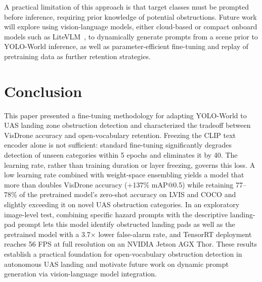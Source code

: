 \documentclass[conf]{new-aiaa}
\begin{document}
A practical limitation of this approach is that target classes must be prompted before
inference, requiring prior knowledge of potential obstructions. Future work will explore using
vision-language models, either cloud-based or compact onboard models such as
LiteVLM~\cite{huang2025litevlmlowlatencyvisionlanguagemodel}, to dynamically generate prompts
from a scene prior to YOLO-World inference, as well as parameter-efficient fine-tuning and
replay of pretraining data as further retention strategies.

\section{Conclusion}

This paper presented a fine-tuning methodology for adapting YOLO-World to UAS landing zone
obstruction detection and characterized the tradeoff between VisDrone accuracy and
open-vocabulary retention. Freezing the CLIP text encoder alone is not sufficient: standard
fine-tuning significantly degrades detection of unseen categories within 5 epochs and
eliminates it by 40. The learning rate, rather than training duration or layer freezing,
governs this loss. A low learning rate combined with weight-space ensembling yields a model
that more than doubles VisDrone accuracy (+137\% mAP@0.5) while retaining 77--78\% of the
pretrained model's zero-shot accuracy on LVIS and COCO and slightly exceeding it on novel UAS
obstruction categories. In an exploratory image-level test, combining specific hazard prompts
with the descriptive landing-pad prompt lets this model identify obstructed landing pads as well
as the pretrained model with a 3.7$\times$ lower false-alarm rate, and TensorRT deployment reaches 56 FPS at full resolution
on an NVIDIA Jetson AGX Thor. These results establish a practical foundation for
open-vocabulary obstruction detection in autonomous UAS landing and motivate future work on
dynamic prompt generation via vision-language model integration.




\end{document}
